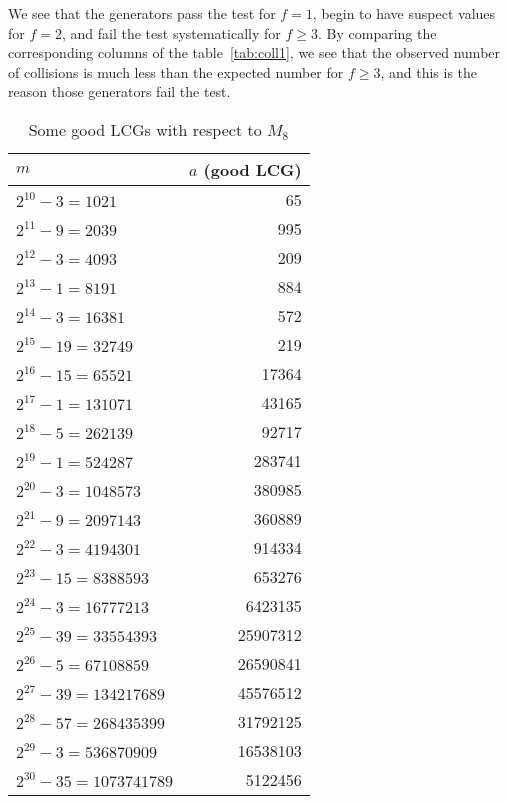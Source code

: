 We see that the generators pass the test for $f=1$, begin to 
have suspect values  for $f=2$, and fail the test
systematically for $f \ge 3$. 
By comparing the  corresponding columns of the table~\ref{tab:coll1}, 
we see that the observed number of 
 collisions is much less than the  expected number
for $f \ge 3$, and this is the reason those generators
fail the test.


\begin {table}
\begin {center}
\caption {Some good LCGs with respect to $M_8$}
\label {tab:lcg1}
\smallskip 
\begin {tabular}{|lr|}
\hline
\qquad $m$             & $a$ (good LCG)   \\
\hline
$2^{10}-3 = 1021$     &  65            \\
$2^{11}-9 = 2039$     & 995            \\
 $2^{12}-3 = 4093$    & 209            \\
 $2^{13}-1 = 8191$    & 884            \\
 $2^{14}-3 = 16381$   & 572            \\
 $2^{15}-19 = 32749$  & 219            \\
 $2^{16}-15 = 65521$  & 17364          \\
 $2^{17}-1 = 131071$  & 43165          \\
 $2^{18}-5 = 262139$  & 92717          \\
 $2^{19}-1 = 524287$  & 283741         \\
 $2^{20}-3 = 1048573$ & 380985         \\
 $2^{21}-9 = 2097143$  & 360889         \\
 $2^{22}-3 = 4194301$  & 914334         \\
 $2^{23}-15 = 8388593$  & 653276        \\
 $2^{24}-3 = 16777213$  & 6423135       \\
 $2^{25}-39 = 33554393$  & 25907312     \\
 $2^{26}-5 = 67108859$  & 26590841      \\
 $2^{27}-39 = 134217689$  & 45576512     \\
 $2^{28}-57 = 268435399$  & 31792125     \\
 $2^{29}-3 = 536870909$   & 16538103     \\
 $2^{30}-35 = 1073741789$  & 5122456     \\
\hline
\end {tabular}
\end {center}
\end {table}


